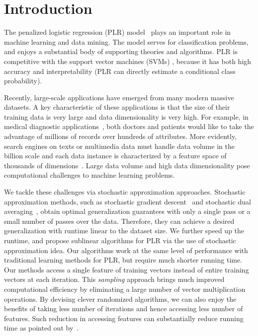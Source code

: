 \documentclass{llncs}
\begin{document}
\section{Introduction} \label{sec:int}

The penalized logistic regression (PLR) model~\cite{HastieBook:SL} plays an important role in machine learning and data mining.
The model serves for classification problems, and enjoys a substantial body of supporting theories and algorithms.
PLR is competitive with the support vector machines (SVMs) \cite{Vapnik:1998}, because it has both high accuracy and  interpretability (PLR can directly estimate a conditional class probability).

Recently, large-scale applications have emerged from many modern massive datasets.
A key characteristic of these applications is that the size of their training data is very large and data dimensionality is very high.
For example, in medical diagnostic applications~\cite{tsumoto2004mining}, both doctors and patients would like to take the advantage of millions of records over hundreds of attributes. More evidently, search engines on texts or multimedia data must handle data volume in the billion scale and each data instance is characterized by a feature space of thousands of dimensions~\cite{genkin2007large}.
Large data volume and high data dimensionality pose computational challenges to machine learning problems.

We tackle these challenges via stochastic approximation approaches.
Stochastic approximation methods, such as stochastic gradient descent~\cite{zhang2004solving} and stochastic dual averaging~\cite{xiao2010dual}, obtain optimal generalization guarantees
with only a single pass or a small number of passes over the data.
Therefore, they can achieve a desired generalization  with runtime linear to the dataset size.
We further speed up the runtime, and propose sublinear algorithms for PLR via the use of stochastic approximation idea.
Our algorithms work at the same level of performance with traditional learning methods for PLR, but require much shorter running time.
Our methods access a single feature of training vectors instead of entire training vectors at each iteration.
This {\em sampling} approach brings much improved computational efficiency by eliminating a large number of vector multiplication operations.
By devising clever randomized algorithms, we can also enjoy the benefits of taking less number of iterations and hence accessing less number of features.
Such reduction in accessing features can substantially reduce running time as pointed out by~\cite{hazanbeating}.
\end{document}
